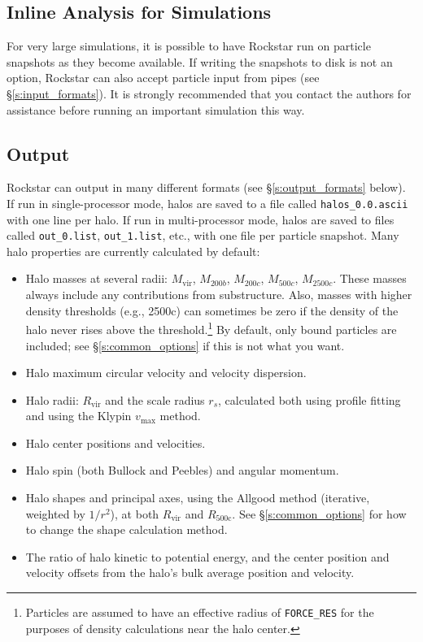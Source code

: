 \documentclass[12pt]{article}
\begin{document}
\subsection{Inline Analysis for Simulations}
      For very large simulations, it is possible to have Rockstar run on particle snapshots as they become available.  If writing the snapshots to disk is not an option, Rockstar can also accept particle input from pipes (see \S \ref{s:input_formats}).  It is strongly recommended that you contact the authors for assistance before running an important simulation this way.

\subsection{Output}
\label{s:output}
Rockstar can output in many different formats (see \S \ref{s:output_formats} below).  If run in single-processor mode, halos are saved to a file called \texttt{halos\_0.0.ascii} with one line per halo.  If run in multi-processor mode, halos are saved to files called \texttt{out\_0.list}, \texttt{out\_1.list}, etc., with one file per particle snapshot.  Many halo properties are currently calculated by default:
\begin{itemize}
\item Halo masses at several radii: $M_\mathrm{vir}$, $M_{200b}$, $M_{200c}$, $M_{500c}$, $M_{2500c}$.  These masses always include any contributions from substructure.  Also, masses with higher density thresholds (e.g., 2500c) can sometimes be zero if the density of the halo never rises above the threshold.\footnote{Particles are assumed to have an effective radius of \texttt{FORCE\_RES} for the purposes of density calculations near the halo center.}  By default, only bound particles are included; see \S \ref{s:common_options} if this is not what you want.
\item Halo maximum circular velocity and velocity dispersion.
\item Halo radii: $R_\mathrm{vir}$ and the scale radius $r_s$, calculated both using profile fitting and using the Klypin $v_\mathrm{max}$ method.
\item Halo center positions and velocities.
\item Halo spin (both Bullock and Peebles) and angular momentum.
\item Halo shapes and principal axes, using the Allgood method (iterative, weighted by $1/r^2$), at both $R_\mathrm{vir}$ and $R_\mathrm{500c}$.  See \S \ref{s:common_options} for how to change the shape calculation method.
\item The ratio of halo kinetic to potential energy, and the center position and velocity offsets from the halo's bulk average position and velocity.
\end{itemize}
\end{document}
